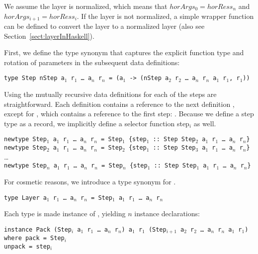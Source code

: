 We assume the layer is normalized, which means that $horArgs_{0} = horRess_n$ and 
$horArgs_{i+1} = horRess_i$. If the layer is not normalized, a simple wrapper function can be defined to convert the layer to a normalized layer (also see Section~\ref{sect:layerInHaskell}).


First, we define the  type synonym that captures the explicit function type and rotation of parameters in the subsequent data definitions:

\begin{small}
\begin{tabbing}
{\tt type St}\={\tt ep nStep a$_1$ r$_1$ \dots~a$_n$ r$_n$ = (a$_1$ -> (nStep a$_2$ r$_2$ \dots~a$_n$ r$_n$ a$_1$ r$_1$, r$_1$))}
\end{tabbing}
\end{small}

Using  the mutually recursive data definitions for each of the steps are straightforward. Each definition  contains a reference to the next definition , except for , which contains a reference to the first step: . Because we define a step type as a record, we implicitly define a selector function {step$_i$} as well.

\begin{small}
{\tt newtype Step$_1$ a$_1$ r$_1$ \dots~a$_n$ r$_n$ = Step$_1$ \{step$_1$}\verb| :: |{\tt Step Step$_2$ a$_1$ r$_1$ \dots~a$_n$ r$_n$\}}\\
{\tt newtype Step$_2$ a$_1$ r$_1$ \dots~a$_n$ r$_n$ = Step$_2$ \{step$_1$}\verb| :: |{\tt Step Step$_3$ a$_1$ r$_1$ \dots~a$_n$ r$_n$\}}\\
\dots \\
{\tt newtype Step$_n$ a$_1$ r$_1$ \dots~a$_n$ r$_n$ = Step$_n$ \{step$_1$}\verb| :: |{\tt Step Step$_1$ a$_1$ r$_1$ \dots~a$_n$ r$_n$\}}
\end{small}

For cosmetic reasons, we introduce a type synonym  for .

{\tt type Layer a$_1$ r$_1$ \dots~a$_n$ r$_n$ = Step$_1$ a$_1$ r$_1$ \dots~a$_n$ r$_n$}

Each  type is made instance of , yielding $n$ instance declarations:

\begin{small}
\begin{tabbing}
{\tt i}\={\tt nstance Pack (Step$_i$ a$_1$ r$_1$ \dots~a$_n$  r$_n$) a$_1$ r$_1$ (Step$_{i+1}$ a$_2$ r$_2$ \dots~a$_n$ r$_n$ a$_1$ r$_1$)}\\
\> {\tt where }\={\tt pack = Step$_i$}\\
\>\> {\tt unpack = step$_i$}
\end{tabbing}
\end{small}

